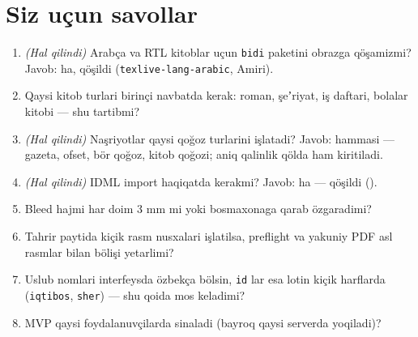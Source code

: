 \documentclass[11pt]{article}
\newcommand\holatbelgi[2]{\tcbox[on line,boxsep=0pt,left=2.5pt,right=2.5pt,top=1pt,bottom=1pt,colback=#1!12,colframe=#1,boxrule=0.4pt,arc=2pt]{\scriptsize\textbf{\color{#1!75!black}#2}}}
\renewcommand\beta{\holatbelgi{urgu}{beta}}
\begin{document}
\section{Siz uçun savollar}\label{sec:sd-savol}
\begin{enumerate}
\item \textit{(Hal qilindi)} Arabça va RTL kitoblar uçun \texttt{bidi} paketini obrazga qöşamizmi? Javob: ha, qöşildi (\texttt{texlive-lang-arabic}, Amiri).
\item Qaysi kitob turlari birinçi navbatda kerak: roman, şeʼriyat, iş daftari, bolalar kitobi --- shu tartibmi?
\item \textit{(Hal qilindi)} Naşriyotlar qaysi qoğoz turlarini işlatadi? Javob: hammasi --- gazeta, ofset, bör qoğoz, kitob qoğozi; aniq qalinlik qölda ham kiritiladi.
\item \textit{(Hal qilindi)} IDML import haqiqatda kerakmi? Javob: ha --- qöşildi (\beta).
\item Bleed hajmi har doim 3 mm mi yoki bosmaxonaga qarab özgaradimi?
\item Tahrir paytida kiçik rasm nusxalari işlatilsa, preflight va yakuniy PDF asl rasmlar bilan bölişi yetarlimi?
\item Uslub nomlari interfeysda özbekça bölsin, \texttt{id} lar esa lotin kiçik harflarda (\texttt{iqtibos}, \texttt{sher}) --- shu qoida mos keladimi?
\item MVP qaysi foydalanuvçilarda sinaladi (bayroq qaysi serverda yoqiladi)?
\end{enumerate}
\end{document}
